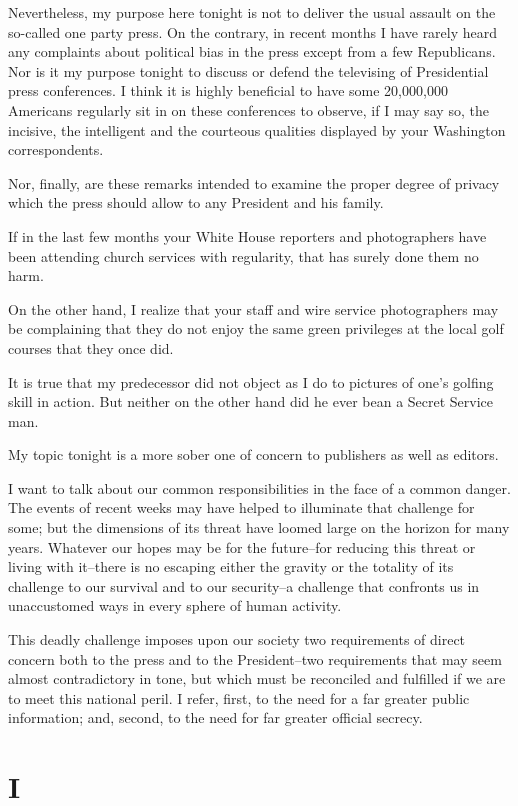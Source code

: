 \documentclass{article}
\begin{document}
Nevertheless, my purpose here tonight is not to deliver the usual assault on the so-called one party press. On the contrary, in recent months I have rarely heard any complaints about political bias in the press except from a few Republicans. Nor is it my purpose tonight to discuss or defend the televising of Presidential press conferences. I think it is highly beneficial to have some 20,000,000 Americans regularly sit in on these conferences to observe, if I may say so, the incisive, the intelligent and the courteous qualities displayed by your Washington correspondents.

Nor, finally, are these remarks intended to examine the proper degree of privacy which the press should allow to any President and his family.

If in the last few months your White House reporters and photographers have been attending church services with regularity, that has surely done them no harm.

On the other hand, I realize that your staff and wire service photographers may be complaining that they do not enjoy the same green privileges at the local golf courses that they once did.

It is true that my predecessor did not object as I do to pictures of one's golfing skill in action. But neither on the other hand did he ever bean a Secret Service man.

My topic tonight is a more sober one of concern to publishers as well as editors.

I want to talk about our common responsibilities in the face of a common danger. The events of recent weeks may have helped to illuminate that challenge for some; but the dimensions of its threat have loomed large on the horizon for many years. Whatever our hopes may be for the future--for reducing this threat or living with it--there is no escaping either the gravity or the totality of its challenge to our survival and to our security--a challenge that confronts us in unaccustomed ways in every sphere of human activity.

This deadly challenge imposes upon our society two requirements of direct concern both to the press and to the President--two requirements that may seem almost contradictory in tone, but which must be reconciled and fulfilled if we are to meet this national peril. I refer, first, to the need for a far greater public information; and, second, to the need for far greater official secrecy.

\section*{I}
\end{document}
